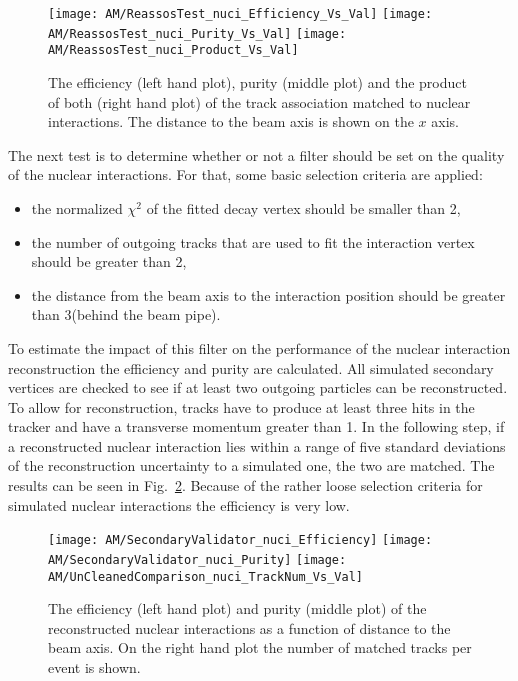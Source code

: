 \begin{figure}[!ht]
    \centering
    \texttt{[image: AM/ReassosTest\_nuci\_Efficiency\_Vs\_Val]}
    \texttt{[image: AM/ReassosTest\_nuci\_Purity\_Vs\_Val]}
    \texttt{[image: AM/ReassosTest\_nuci\_Product\_Vs\_Val]}
    \caption[Efficiency, purity and their product of the association with nuclear interactions for different search options as a function of distance to the beam axis]{The efficiency (left hand plot), purity (middle plot) and the product of both (right hand plot) of the track association matched to nuclear interactions. The distance to the beam axis is shown on the $x$ axis.\label{plot:AMWFSVnuciEffAndPurSO}}
\end{figure}

The next test is to determine whether or not a filter should be set on the quality of the nuclear interactions. For that, some basic selection criteria are applied:
\begin{itemize}
    \item the normalized $\chi^{2}$ of the fitted decay vertex should be smaller than 2,
    \item the number of outgoing tracks that are used to fit the interaction vertex should be greater than 2,
    \item the distance from the beam axis to the interaction position should be greater than 3\cm (behind the beam pipe).
\end{itemize}
To estimate the impact of this filter on the performance of the nuclear interaction reconstruction the efficiency and purity are calculated. All simulated secondary vertices are checked to see if at least two outgoing particles can be reconstructed. To allow for reconstruction, tracks have to produce at least three hits in the tracker and have a transverse momentum greater than 1\GeV. In the following step, if a reconstructed nuclear interaction lies within a range of five standard deviations of the reconstruction uncertainty to a simulated one, the two are matched. The results can be seen in Fig.~\ref{plot:AMWFSVnuciEffAndPurDC}. Because of the rather loose selection criteria for simulated nuclear interactions the efficiency is very low.

\begin{figure}[!ht]
    \centering
    \texttt{[image: AM/SecondaryValidator\_nuci\_Efficiency]}
    \texttt{[image: AM/SecondaryValidator\_nuci\_Purity]}
    \texttt{[image: AM/UnCleanedComparison\_nuci\_TrackNum\_Vs\_Val]}
    \caption[Purity and efficiency of the reconstructed nuclear interactions as a function of distance to the beam axis and number of matched tracks]{The efficiency (left hand plot) and purity (middle plot) of the reconstructed nuclear interactions as a function of distance to the beam axis. On the right hand plot the number of matched tracks per event is shown. \label{plot:AMWFSVnuciEffAndPurDC}}
\end{figure}

